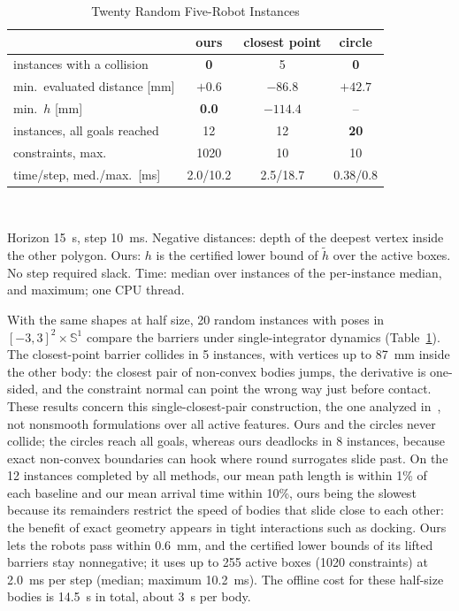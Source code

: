 \documentclass[journal]{IEEEtran}
\theoremstyle{definition}
\newcommand{\Sone}{\mathbb{S}^1}
\begin{document}
\begin{table}[t]
\caption{Twenty Random Five-Robot Instances}
\label{tab:stats}
\centering
\footnotesize
\setlength{\tabcolsep}{4pt}
\renewcommand{\arraystretch}{1.05}
\begin{tabular}{lccc}
\toprule
& ours & closest point & circle\\
\midrule
instances with a collision & \textbf{0} & 5 & \textbf{0}\\
min.\ evaluated distance [mm] & $+0.6$ & $-86.8$ & $+42.7$\\
min.\ $h$ [mm] & \textbf{0.0} & $-114.4$ & --\\
instances, all goals reached & 12 & 12 & \textbf{20}\\
constraints, max. & 1020 & 10 & 10\\
time/step, med./max.\ [ms] & 2.0/10.2 & 2.5/18.7 & 0.38/0.8\\
\bottomrule
\end{tabular}
\\[3pt]
\parbox{\columnwidth}{\footnotesize Horizon 15~s, step 10~ms. Negative distances: depth of the
deepest vertex inside the other polygon. Ours: $h$ is the certified lower bound of $\tilde h$ over the
active boxes. No step required slack. Time: median over instances of the per-instance median, and
maximum; one CPU thread.}
\end{table}

With the same shapes at half size, 20 random instances with poses in $[-3,3]^2\times\Sone$ compare
the barriers under single-integrator dynamics (Table~\ref{tab:stats}). The closest-point barrier
collides in 5 instances, with vertices up to 87~mm inside the other body: the closest pair of
non-convex bodies jumps, the derivative is one-sided, and the constraint normal can point the wrong
way just before contact. These results concern this single-closest-pair construction, the one
analyzed in~\cite{jo2026geometry}, not nonsmooth formulations over all active features. Ours and the
circles never collide; the circles reach all goals, whereas ours deadlocks in 8 instances, because
exact non-convex boundaries can hook where round surrogates slide past. On the 12 instances completed
by all methods, our mean path length is within 1\% of each baseline and our mean arrival time
within 10\%, ours being the
slowest because its remainders restrict the speed of bodies that slide close to each other: the
benefit of exact geometry appears in tight interactions such as docking. Ours lets the robots pass
within 0.6~mm, and the certified lower bounds of its lifted barriers stay nonnegative; it uses up to
255 active boxes (1020 constraints) at 2.0~ms per step (median; maximum 10.2~ms). The offline cost
for these half-size bodies is 14.5~s in total, about 3~s per body.
\end{document}
